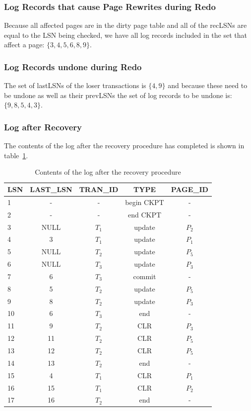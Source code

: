 \documentclass[a4paper,11pt]{article}
\begin{document}
\subsubsection{Log Records that cause Page Rewrites during Redo}
Because all affected pages are in the dirty page table and all of the recLSNs are equal to the LSN being checked, we have all log records included in the set that affect a page: \(\{3, 4, 5, 6, 8, 9\}\).

\subsubsection{Log Records undone during Redo}
The set of lastLSNs of the loser transactions is \(\{4, 9\}\) and because these need to be undone as well as their prevLSNs the set of log records to be undone is: \(\{9, 8, 5, 4, 3\}\).

\subsubsection{Log after Recovery}
The contents of the log after the recovery procedure has completed is shown in table~\ref{tab:final}.

\begin{table}[ht]
  \centering
  \begin{tabular}{l | c | c | c | c}
    LSN & LAST\_LSN & TRAN\_ID & TYPE & PAGE\_ID\\ \hline
    1 & - & - & begin CKPT & -\\
    2 & - & - & end CKPT & -\\
    3 & NULL & \(T_1\) & update & \(P_2\)\\
    4 & 3 & \(T_1\) & update & \(P_1\)\\
    5 & NULL & \(T_2\) & update & \(P_5\)\\
    6 & NULL & \(T_3\) & update & \(P_3\)\\
    7 & 6 & \(T_3\) & commit & -\\
    8 & 5 & \(T_2\) & update & \(P_5\)\\
    9 & 8 & \(T_2\) & update & \(P_3\)\\
    10 & 6 & \(T_3\) & end & -\\ \hline
    11 & 9 & \(T_2\) & CLR & \(P_3\)\\
    12 & 11 & \(T_2\) & CLR & \(P_5\)\\
    13 & 12 & \(T_2\) & CLR & \(P_5\)\\
    14 & 13 & \(T_2\) & end & -\\
    15 & 4 & \(T_1\) & CLR & \(P_1\)\\
    16 & 15 & \(T_1\) & CLR & \(P_2\)\\
    17 & 16 & \(T_2\) & end & -\\
  \end{tabular}
  \caption{Contents of the log after the recovery procedure}
  \label{tab:final}
\end{table}
\end{document}
